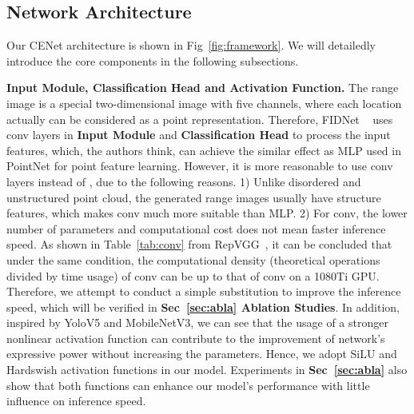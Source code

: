 \documentclass{article}
\begin{document}
\subsection{Network Architecture}
\label{sec:network arch}
Our CENet architecture is shown in Fig~\ref{fig:framework}. We will detailedly introduce the core components in the following subsections.

\noindent\textbf{Input Module, Classification Head and Activation Function.} The range image is a special two-dimensional image with five channels, where each location actually can be considered as a point representation. Therefore, FIDNet ~\cite{zhao2021fidnet} uses  conv layers in \textbf{Input Module} and \textbf{Classification Head} to process the input features, which, the authors think, can achieve the similar effect as MLP used in PointNet for point feature learning. However, it is more reasonable to use  conv layers instead of , due to the following reasons. 1) Unlike disordered and unstructured point cloud, the generated range images usually have structure features, which makes  conv much more suitable than MLP. 2) For  conv, the lower number of parameters and computational cost does not mean faster inference speed. As shown in Table~\ref{tab:conv} from RepVGG~\cite{ding2021repvgg}, it can be concluded that under the same condition, the computational density (theoretical operations divided by time usage) of  conv can be up to  that of  conv on a 1080Ti GPU. Therefore, we attempt to conduct a simple substitution to improve the inference speed, which will be verified in \textbf{ Sec~\ref{sec:abla} Ablation Studies}. In addition, inspired by YoloV5 and MobileNetV3, we can see that the usage of a stronger nonlinear activation function can contribute to the improvement of network's expressive power without increasing the parameters. Hence, we adopt SiLU and Hardswish activation functions in our model. Experiments in \textbf{Sec~\ref{sec:abla}} also show that both functions can enhance our model's performance with little influence on inference speed.
\end{document}
